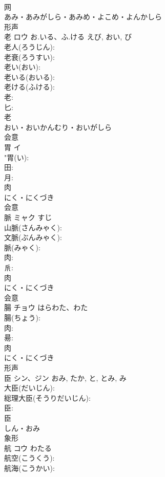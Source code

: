 \documentclass[8pt]{extreport}
\begin{document}
\begin{CJK}{UTF8}{min}
\\	网	
\\	あみ・あみがしら・あみめ・よこめ・よんかしら	
\\	形声 
\\	老	ロウ	お.いる、ふ.ける	えび, おい, び	
\\	老人(ろうじん): 
\\	老衰(ろうすい): 
\\	老い(おい): 
\\	老いる(おいる): 
\\	老ける(ふける): 
\\	老: 
\\	匕: 
\\	老	
\\	おい・おいかんむり・おいがしら	
\\	会意 
\\	胃	イ			
\\	"胃(い): 
\\	田: 
\\	月: 
\\	肉	
\\	にく・にくづき	
\\	会意 
\\	脈	ミャク	すじ		
\\	山脈(さんみゃく): 
\\	文脈(ぶんみゃく): 
\\	脈(みゃく): 
\\	肉: 
\\	𠂢: 
\\	肉	
\\	にく・にくづき	
\\	会意 
\\	腸	チョウ	はらわた、わた		
\\	腸(ちょう): 
\\	肉: 
\\	昜: 
\\	肉	
\\	にく・にくづき	
\\	形声 
\\	臣	シン、ジン		おみ, たか, と, とみ, み	
\\	大臣(だいじん): 
\\	総理大臣(そうりだいじん): 
\\	臣: 
\\	臣	
\\	しん・おみ	
\\	象形 
\\	航	コウ		わたる	
\\	航空(こうくう): 
\\	航海(こうかい): 

\end{CJK}
\end{document}
